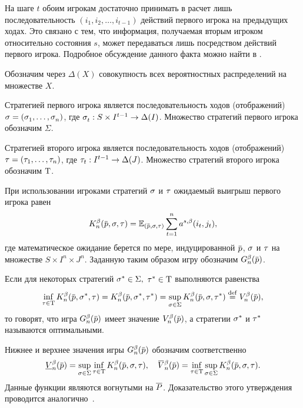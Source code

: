 {На шаге $t$ обоим игрокам достаточно принимать в расчет лишь последовательность $(i_1, i_2, \ldots, i_{t-1})$ действий первого игрока на предыдущих ходах.
Это связано с тем, что информация, получаемая вторым игроком относительно состояния $s$, может передаваться лишь посредством действий первого игрока.
Подробное обсуждение данного факта можно найти в \cite{mertens15}.

Обозначим через $\Delta(X)$ совокупность всех вероятностных распределений на множестве $X$.

Стратегией первого игрока является последовательность ходов (отображений)
$\sigmar = (\sigmas{1}, \ldots, \sigmas{n})$, где $\sigmas{t}: S \times I^{t-1} \rightarrow \Delta(I)$.
Множество стратегий первого игрока обозначим $\Sigma$.

Стратегией второго игрока является последовательность ходов (отображений)
$\tau = (\tau_{1}, \ldots, \tau_{n})$, где $\tau_{t}: I^{t-1} \rightarrow \Delta(J)$.
Множество стратегий второго игрока обозначим $\mathrm{T}$.

При использовании игроками стратегий $\sigma$ и $\tau$ ожидаемый выигрыш первого игрока равен
\begin{equation*}
  \K{n}(\pd, \sigmar, \taur) =
  \E_{(\pd, \sigmar, \taur)} \sum_{t=1}^n \as(i_t, j_t),
\end{equation*}
где математическое ожидание берется по мере, индуцированной $\pd$, $\sigma$ и $\tau$ на множестве $S \times I^n \times J^n$.
Заданную таким образом игру обозначим $\theG{n}(\pd)$.

Если для некоторых стратегий $\sigma^* \in \Sigma,$ $\tau^* \in \mathrm{T}$ выполняются равенства
\begin{equation*}
  \inf_{\taur \in \Tau} \K{n}(\pd, \sigmar^*, \taur) =
  \K{n}(\pd, \sigmar^*, \taur^*) =
  \sup_{\sigmar \in \Sigma} \K{n}(\pd, \sigmar, \taur^*) \eqdef
  \V{n}(\pd),
\end{equation*}
то говорят, что игра $\theG{n}(\pd)$ имеет значение $\V{n}(\pd)$, а стратегии $\sigma^*$ и $\tau^*$
называются оптимальными.

Нижнее и верхнее значения игры $\theG{n}(\pd)$ обозначим соответственно
\begin{equation*}
  \LowV{n}(\pd) =
    \sup_{\sigmar \in \Sigma}
    \inf_{\taur \in \Tau}
    \K{n}(\pd, \sigmar, \taur), \quad
  \HighV{n}(\pd) =
    \inf_{\taur \in \Tau}
    \sup_{\sigmar \in \Sigma}
    \K{n}(\pd, \sigmar, \taur).
\end{equation*}
Данные функции являются вогнутыми на $\overline{P}$.
Доказательство этого утверждения проводится аналогично~\cite{domansky07}.

}
